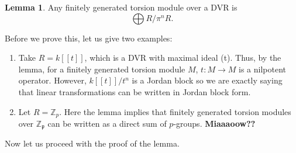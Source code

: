 \documentclass[12 pt]{article}
\theoremstyle{definition}
\newtheorem{lemma}[theorem]{Lemma}
\newcommand\zz{\mathbb{Z}}
\newcommand\fp{{\mathfrak p}}
\begin{document}
\begin{lemma} Any finitely generated torsion module over a DVR is
\[\bigoplus R/\pi^nR.\]
\label{dvr fin gen tor module struct}
\end{lemma}
Before we prove this, let us give two examples:
\begin{enumerate}
\item Take $R=k[[t]]$, which is a DVR with maximal ideal (t). Thus, by the lemma, for a finitely generated torsion module $M$, $t:M \to M$ is a nilpotent operator. However, $k[[t]]/t^n$ is a Jordan block so we are exactly saying that linear transformations can be written in Jordan block form.
\item Let $R=\zz_p$. Here the lemma implies that finitely generated torsion modules over $\zz_\fp$ can be written as a direct sum of $p$-groups. \textcolor[rgb]{0.98,0.00,0.00}{\textbf{Miaaaoow??}}
\end{enumerate}
Now let us proceed with the proof of the lemma.
\end{document}
